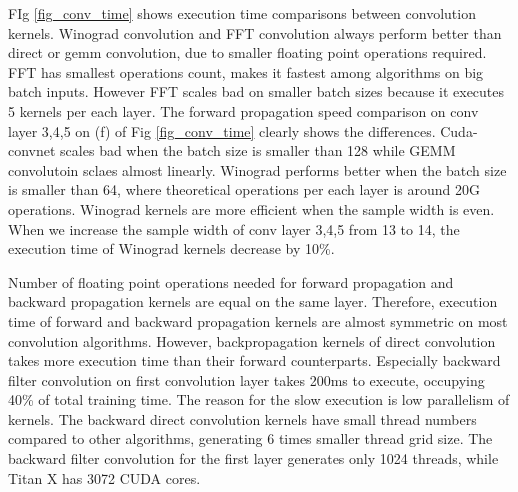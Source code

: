 FIg \ref{fig_conv_time} shows execution time comparisons between convolution kernels.
Winograd convolution and FFT convolution always perform better than direct or gemm convolution, due to smaller floating point operations required.
FFT has smallest operations count, makes it fastest among algorithms on big batch inputs.
However FFT scales bad on smaller batch sizes because it executes 5 kernels per each layer.
The forward propagation speed comparison on conv layer 3,4,5 on (f) of Fig \ref{fig_conv_time} clearly shows the differences.
Cuda-convnet scales bad when the batch size is smaller than 128 while GEMM convolutoin sclaes almost linearly.
Winograd performs better when the batch size is smaller than 64, where theoretical operations per each layer is around 20G operations.
Winograd kernels are more efficient when the sample width is even.
When we increase the sample width of conv layer 3,4,5 from 13 to 14, the execution time of Winograd kernels decrease by 10\%.

Number of floating point operations needed for forward propagation and backward propagation kernels are equal on the same layer.
Therefore, execution time of forward and backward propagation kernels are almost symmetric on most convolution algorithms.
However, backpropagation kernels of direct convolution takes more execution time than their forward counterparts.
Especially backward filter convolution on first convolution layer takes 200ms to execute, occupying 40\% of total training time.
The reason for the slow execution is low parallelism of kernels.
The backward direct convolution kernels have small thread numbers compared to other algorithms, generating 6 times smaller thread grid size.
The backward filter convolution for the first layer generates only 1024 threads, while Titan X has 3072 CUDA cores.





